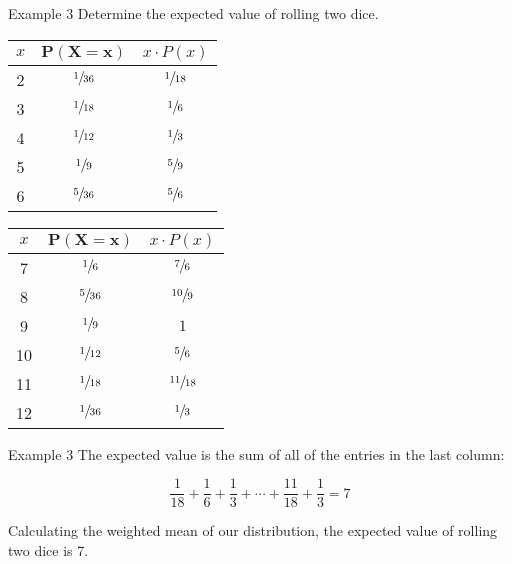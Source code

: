 \documentclass[t]{beamer}
\begin{document}
\begin{frame}{Example 3}
Determine the expected value of rolling two dice.	\pause

\begin{center}
\begin{minipage}{0.4\textwidth}
\setlength{\extrarowheight}{4pt}
\begin{tabular}{c|c|c}
$x$ &  $\bm{P(X=x)}$ 	&	$x \cdot P(x)$ 	\\ \hline
2 & $\sfrac{1}{36}$ 	&  	$\sfrac{1}{18}$	\\[4pt]
3 & $\sfrac{1}{18}$ 	&	$\sfrac{1}{6}$	\\[4pt]
4 & $\sfrac{1}{12}$		&	$\sfrac{1}{3}$ 	\\[4pt]
5 & $\sfrac{1}{9}$		&	$\sfrac{5}{9}$ 	\\[4pt]
6 & $\sfrac{5}{36}$		&	$\sfrac{5}{6}$ 	\\
\end{tabular}
\end{minipage}
\hspace{8pt}
\begin{minipage}{0.4\textwidth}
\setlength{\extrarowheight}{4pt}
\begin{tabular}{c|c|c}
$x$ &  $\bm{P(X=x)}$ 	&	$x \cdot P(x)$ 	\\ \hline
7 & $\sfrac{1}{6}$ 		&	$\sfrac{7}{6}$	\\[4pt]
8 & $\sfrac{5}{36}$		&	$\sfrac{10}{9}$ \\[4pt]
9 & $\sfrac{1}{9}$		&	$1$ \\[4pt]
10 & $\sfrac{1}{12}$ 	&	$\sfrac{5}{6}$\\[4pt]
11 & $\sfrac{1}{18}$	&	$\sfrac{11}{18}$ \\[4pt]
12 & $\sfrac{1}{36}$ 	&	$\sfrac{1}{3}$
\end{tabular}
\end{minipage}
\end{center}
\end{frame}

\begin{frame}{Example 3}
The expected value is the sum of all of the entries in the last column:	\pause

\[\frac{1}{18} + \frac{1}{6} + \frac{1}{3} + \cdots + \frac{11}{18} + \frac{1}{3} = 7\]	\bigskip

Calculating the weighted mean of our distribution, the expected value of rolling two dice is 7.
\end{frame}
\end{document}
